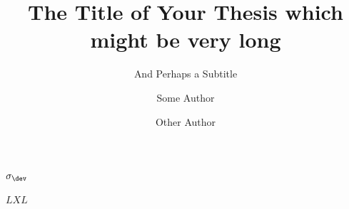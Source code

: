\documentclass[masters,a4paper]{chalmers-thesis}
\title{The Title of Your Thesis which might be very long}
\subtitle{And Perhaps a Subtitle}
\author{Some Author\and Other Author}
\begin{document}
$\sigma_\dev$


$LXL$
%

%

\nocite{*} %
\printbibliography
\end{document}
